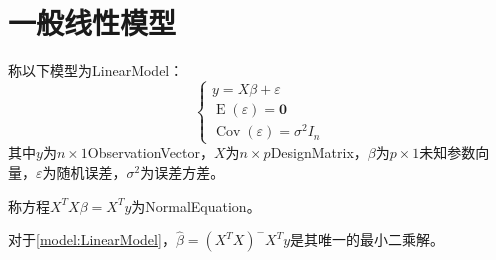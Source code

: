\section{一般线性模型}
\begin{definition}\label{model:LinearModel}
	称以下模型为\gls{LinearModel}：
	\begin{equation*}
		\begin{cases}
			y=X\beta+\varepsilon \\
			\operatorname{E}(\varepsilon)=\mathbf{0} \\
			\operatorname{Cov}(\varepsilon)=\sigma^2I_n
		\end{cases}
	\end{equation*}
	其中$y$为$n\times 1$\gls{ObservationVector}，$X$为$n\times p$\gls{DesignMatrix}，$\beta$为$p\times 1$未知参数向量，$\varepsilon$为随机误差，$\sigma^2$为误差方差。
\end{definition}
\begin{definition}
	称方程$X^TX\beta=X^Ty$为\gls{NormalEquation}。
\end{definition}
\begin{theorem}\label{theo:LSELinearModel}
	对于\cref{model:LinearModel}，$\hat{\beta}=(X^TX)^-X^Ty$是其唯一的最小二乘解。
\end{theorem}
